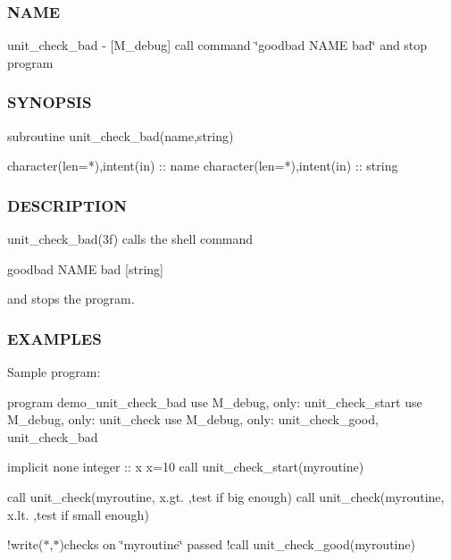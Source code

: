 \subsubsection*{N\+A\+ME}

unit\+\_\+check\+\_\+bad -\/ \mbox{[}M\+\_\+debug\mbox{]} call command \char`\"{}goodbad N\+A\+M\+E bad\char`\"{} and stop program 

\subsubsection*{S\+Y\+N\+O\+P\+S\+IS}

\begin{DoxyVerb}subroutine unit_check_bad(name,string)

 character(len=*),intent(in) :: name
 character(len=*),intent(in) :: string
\end{DoxyVerb}


\subsubsection*{D\+E\+S\+C\+R\+I\+P\+T\+I\+ON}

\begin{DoxyVerb}unit_check_bad(3f) calls the shell command

     goodbad NAME bad [string]

and stops the program.
\end{DoxyVerb}


\subsubsection*{E\+X\+A\+M\+P\+L\+ES}

Sample program\+:

program demo\+\_\+unit\+\_\+check\+\_\+bad use M\+\_\+debug, only\+: unit\+\_\+check\+\_\+start use M\+\_\+debug, only\+: unit\+\_\+check use M\+\_\+debug, only\+: unit\+\_\+check\+\_\+good, unit\+\_\+check\+\_\+bad

implicit none integer \+:\+: x x=10 call unit\+\_\+check\+\_\+start(\textquotesingle{}myroutine\textquotesingle{})

call unit\+\_\+check(\textquotesingle{}myroutine\textquotesingle{}, x.\+gt. ,\textquotesingle{}test if big enough\textquotesingle{}) call unit\+\_\+check(\textquotesingle{}myroutine\textquotesingle{}, x.\+lt. ,\textquotesingle{}test if small enough\textquotesingle{})

!write($\ast$,$\ast$)\textquotesingle{}checks on \char`\"{}myroutine\char`\"{} passed\textquotesingle{} !call unit\+\_\+check\+\_\+good(\textquotesingle{}myroutine\textquotesingle{})

